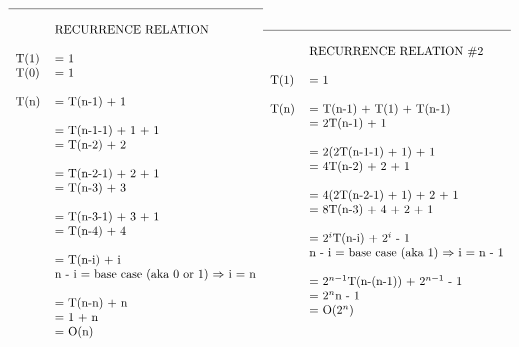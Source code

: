 \documentclass{article}
\begin{document}
\begin{math}
\begin{tabular}{ l l l }
\end{tabular}
\newline
\begin{tabular}{ l l }
\hline \\
& RECURRENCE RELATION
\\
\\
T(1) & = 1 \\
T(0) & = 1 \\ \\
T(n) & = T(n-1) + 1 \\ \\
& = T(n-1-1) + 1 + 1 \\
& = T(n-2) + 2 \\ \\
& = T(n-2-1) + 2 + 1 \\
& = T(n-3) + 3 \\ \\
& = T(n-3-1) + 3 + 1 \\
& = T(n-4) + 4 \\ \\
& = T(n-i) + i \\
& n - i = base case (aka 0 or 1) $\Rightarrow$ i = n \\ \\
& = T(n-n) + n \\
& = 1 + n \\
& = O(n) \\
\\
\end{tabular}
\newline
\begin{tabular}{ l l }
\hline \\
& RECURRENCE RELATION \#2
\\
\\
T(1) & = 1 \\ \\
T(n) & = T(n-1) + T(1) + T(n-1) \\
& = 2T(n-1) + 1 \\ \\
& = 2(2T(n-1-1) + 1) + 1 \\
& = 4T(n-2) + 2 + 1 \\ \\
& = 4(2T(n-2-1) + 1) + 2 + 1 \\
& = 8T(n-3) + 4 + 2 + 1 \\ \\
& = 2$^{i}$T(n-i) + 2$^{i}$ - 1 \\
& n - i = base case (aka 1) $\Rightarrow$ i = n - 1 \\ \\
& = 2$^{n-1}$T(n-(n-1)) + 2$^{n-1}$ - 1 \\
& = 2$^{n}$n - 1 \\
& = O(2$^{n}$) \\
\\
\end{tabular}
\end{math}
\end{document}
